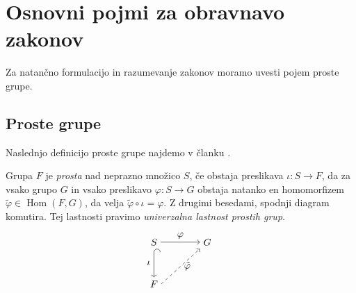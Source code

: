 \section{Osnovni pojmi za obravnavo zakonov}

Za natančno formulacijo in razumevanje zakonov moramo uvesti pojem proste grupe.

\subsection{Proste grupe}

Naslednjo definicijo proste grupe najdemo v članku \cite{Pogacnik_2024}.

\begin{definicija}
\label{def_prosta_grupa}
Grupa $F$ je \emph{prosta} nad neprazno množico $S$, če obstaja preslikava $\iota : S \to F$, da za vsako grupo $G$ in vsako preslikavo $\varphi: S \to  G $ obstaja natanko en homomorfizem $\tilde{\varphi} \in \operatorname{Hom}(F, G)$,
da velja $\tilde{\varphi} \circ \iota = \varphi$. Z drugimi besedami, spodnji diagram komutira. Tej lastnosti pravimo \emph{univerzalna lastnost prostih grup}.  
\[ 
\begin{tikzpicture}
    \matrix (m)
      [
        matrix of math nodes,
        row sep    = 3em,
        column sep = 4em
      ]
      {
        S    & G \\
        F  &             \\
      };
    \path
      (m-1-1) edge [{Hooks[right,length=0.8ex]}->] node [left] {$\iota$} (m-2-1)
      (m-1-1.east |- m-1-2)
        edge [->] node [above] {$\varphi$} (m-1-2)
      (m-2-1.east) edge [->,
        dashed] node [right] {$\tilde{\varphi}$} (m-1-2);
  \end{tikzpicture} \]
\end{definicija}

